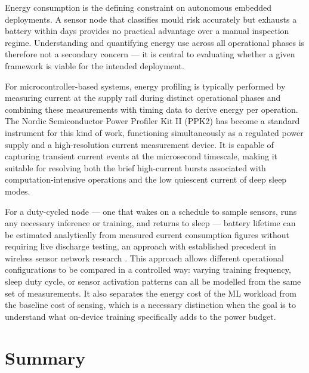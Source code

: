 Energy consumption is the defining constraint on autonomous embedded deployments. A sensor node that classifies mould risk accurately but exhausts a battery within days provides no practical advantage over a manual inspection regime. Understanding and quantifying energy use across all operational phases is therefore not a secondary concern --- it is central to evaluating whether a given framework is viable for the intended deployment.

For microcontroller-based systems, energy profiling is typically performed by measuring current at the supply rail during distinct operational phases and combining these measurements with timing data to derive energy per operation. The Nordic Semiconductor Power Profiler Kit II (PPK2) \cite{PPK2datasheet} has become a standard instrument for this kind of work, functioning simultaneously as a regulated power supply and a high-resolution current measurement device. It is capable of capturing transient current events at the microsecond timescale, making it suitable for resolving both the brief high-current bursts associated with computation-intensive operations and the low quiescent current of deep sleep modes.

For a duty-cycled node --- one that wakes on a schedule to sample sensors, runs any necessary inference or training, and returns to sleep --- battery lifetime can be estimated analytically from measured current consumption figures without requiring live discharge testing, an approach with established precedent in wireless sensor network research \cite{Rodrigues2017}. This approach allows different operational configurations to be compared in a controlled way: varying training frequency, sleep duty cycle, or sensor activation patterns can all be modelled from the same set of measurements. It also separates the energy cost of the ML workload from the baseline cost of sensing, which is a necessary distinction when the goal is to understand what on-device training specifically adds to the power budget.

\section{Summary}

